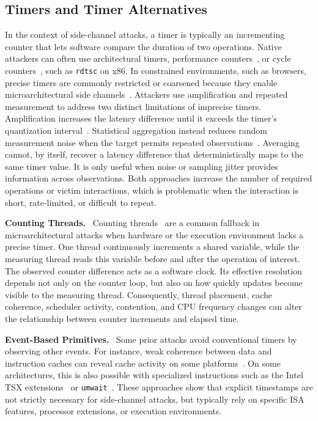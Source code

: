 \documentclass[letterpaper,twocolumn,10pt]{article} %
\newcommand{\code}[1]{\texttt{#1}\xspace}
\newcommand{\paragrabf}[1]{\noindent \textbf{#1.}\ }
\begin{document}
\subsection{Timers and Timer Alternatives}\label{sec:background:timers}
In the context of side-channel attacks, a timer is typically an incrementing counter that lets software compare the duration of two operations.
Native attackers can often use architectural timers, performance counters~\cite{Lipp2016}, or cycle counters~\cite{Gerlach2023A}, such as \code{rdtsc} on x86.
In constrained environments, such as browsers, precise timers are commonly restricted or coarsened because they enable microarchitectural side channels~\cite{Schwarz2017Timers,VanGoethem2015}.
Attackers use amplification and repeated measurement to address two distinct limitations of imprecise timers.
Amplification increases the latency difference until it exceeds the timer's quantization interval~\cite{Allan2016,Schwarzl2021dynamic,Purnal2023showtime,Katzman2023gates}.
Statistical aggregation instead reduces random measurement noise when the target permits repeated observations~\cite{Bernstein2005,Schwarz2019netspectre}.
Averaging cannot, by itself, recover a latency difference that deterministically maps to the same timer value.
It is only useful when noise or sampling jitter provides information across observations.
Both approaches increase the number of required operations or victim interactions, which is problematic when the interaction is short, rate-limited, or difficult to repeat.

\paragrabf{Counting Threads}
Counting threads~\cite{Schwarz2017Timers,Lipp2016,Gras2017aslr,Hetterich2022Branch} are a common fallback in microarchitectural attacks when hardware or the execution environment lacks a precise timer.
One thread continuously increments a shared variable, while the measuring thread reads this variable before and after the operation of interest.
The observed counter difference acts as a software clock.
Its effective resolution depends not only on the counter loop, but also on how quickly updates become visible to the measuring thread.
Consequently, thread placement, cache coherence, scheduler activity, contention, and CPU frequency changes can alter the relationship between counter increments and elapsed time.

\paragrabf{Event-Based Primitives}
Some prior attacks avoid conventional timers by observing other events.
For instance, weak coherence between data and instruction caches can reveal cache activity on some platforms~\cite{Guanciale2016Cache,Jin2025Ghostcache,Thomas2025Exfilstate,thomas2026riscy}.
On some architectures, this is also possible with specialized instructions such as the Intel TSX extensions~\cite{Disselkoen2017prime,kim2022dprime,Hornetz2026tdxray} or \texttt{umwait}~\cite{Zhang2023MWAIT}.
These approaches show that explicit timestamps are not strictly necessary for side-channel attacks, but typically rely on specific ISA features, processor extensions, or execution environments.
\end{document}

